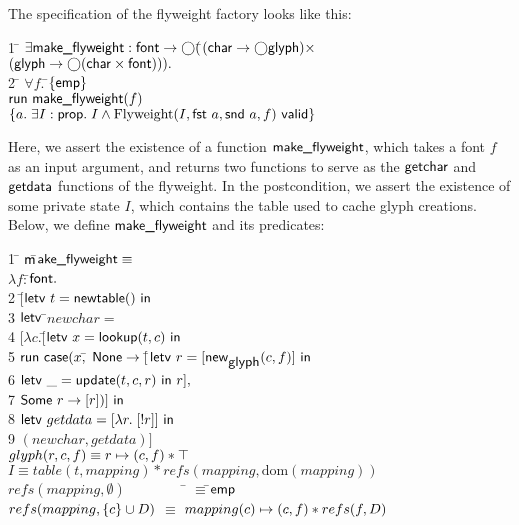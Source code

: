 \documentclass[preprint,natbib]{sigplanconf}
\begin{document}
The specification of the flyweight factory looks like this:
{\small
\begin{tabbing}
1 \qquad \= $\exists \mbox{\textsf{{make\_flyweight}}} :
\mbox{\textsf{{font}}} \to \bigcirc($\=$(\mbox{\textsf{{char}}} \to \bigcirc{\mbox{\textsf{{glyph}}}}) \times$ \\
\> \> $(\mbox{\textsf{{glyph}}} \to \bigcirc{(\mbox{\textsf{{char}}}\times \mbox{\textsf{{font}}})})).$\\
2 \> \;\;\= $\forall f.\;$\=$\{{\mathsf{emp}}\}$ \\
  \>\> \> $\mbox{\textsf{{run }}}{\mbox{\textsf{{make\_flyweight}}}(f)}$ \\
  \>\> \> $\{{a.\; \exists I:\mbox{\textsf{{prop}}}.\; I \land {\mbox{Flyweight}(I, \mbox{\textsf{{fst }}} a, \mbox{\textsf{{snd }}} a, f)}\mbox{\textsf{{ valid}}}}\}$ \\
\end{tabbing}
}
Here, we assert the existence of a function $\mbox{\textsf{{make\_flyweight}}}$,
which takes a font $f$ as an input argument, and returns two functions
to serve as the $\mbox{\textsf{{getchar}}}$ and $\mbox{\textsf{{getdata}}}$ functions of
the flyweight. In the postcondition, we assert the existence of some
private state $I$, which contains the table used to cache glyph
creations. Below, we define
$\mbox{\textsf{{make\_flyweight}}}$ and its predicates: {\small
\begin{tabbing}
1 \qquad \= $\mbox{\textsf{{m}}}$\=$\mbox{\textsf{{ake\_flyweight}}} \equiv$ \\
   \> \>     $\lambda f:$\=$\mbox{\textsf{{font}}}.\;$\\
2  \> \> $[$\=$\mbox{\textsf{{letv }}}t = \mbox{\textsf{{newtable}}}()\mbox{\textsf{{ in }}}$ \\
3  \> \> \> $\mbox{\textsf{{letv }}}$\=$newchar =$ \\
4  \> \> \> \> \!\!$[\lambda c.[$\=$\mbox{\textsf{{letv }}}x = \mbox{\textsf{{lookup}}}(t, c)\mbox{\textsf{{ in}}}$\\
5  \> \> \>\>\> $\mbox{\textsf{{run }}}\mbox{\textsf{{case}}}(x,$\=
$\mbox{\textsf{{None}}} \to [$\=$\mbox{\textsf{{letv }}} r = [\mbox{\textsf{{new}}}_{\mbox{\textsf{{glyph}}}} (c,f)] \mbox{\textsf{{ in}}}$\\
6  \> \> \>\>\>\>\> $\mbox{\textsf{{letv }}} \_ = \mbox{\textsf{{update}}}(t, c, r) \mbox{\textsf{{ in }}}r],$ \\
7 \> \> \>\>\>\> $\mbox{\textsf{{Some }}}r \to [r])] \mbox{\textsf{{ in}}}$ \\
8 \> \> \> $\mbox{\textsf{{letv }}}getdata = [\lambda r.\; [!r]] \mbox{\textsf{{ in}}}$ \\
9 \> \> \> $(newchar, getdata)]$
\\[0.5em]

$glyph(r, c, f) \equiv r \mapsto (c,f) * \top$ \\[0.5em]

$I \equiv table(t,mapping) * refs(mapping, \mbox{dom}(mapping))$ \\[0.5em]

$refs(mapping, \emptyset) \qquad\qquad  $ \= $\equiv$\;\;\=$\mathsf{emp}$ \\
$refs(mapping, \{{c}\} \cup D)$ \> $\equiv$\> $mapping(c) \mapsto (c,f) * refs(f, D)$ \\
 
\end{tabbing}
}
\end{document}
